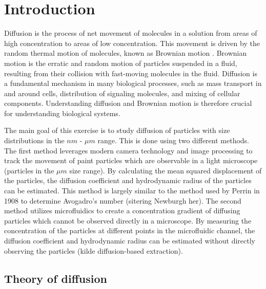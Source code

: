 \section{Introduction}


Diffusion is the process of net movement of molecules in a solution from areas of high concentration
to areas of low concentration. This movement is driven
by the random thermal motion of molecules, known as Brownian motion \cite[512]{author2020book}.
Brownian motion is the erratic and random motion of particles suspended in a fluid,
resulting from their collision with fast-moving molecules in the fluid.
Diffusion is a fundamental mechanism in many biological processes,
such as mass transport in and around cells,
distribution of signaling molecules, and mixing of cellular components.
Understanding diffusion and Brownian motion is therefore crucial for understanding biological systems.

The main goal of this exercise is to study diffusion of particles with size distributions in the $nm$ - $\mu m$ range.
This is done using two different methods. The first method leverages modern camera technology and image processing to track the movement of
paint particles which are observable in a light microscope (particles in the $\mu m$ size range).
By calculating the mean squared displacement
of the particles, the diffusion coefficient and hydrodynamic radius of the particles can be estimated.
This method is largely similar to the method used by Perrin in 1908 to determine Avogadro's number (sitering Newburgh her).
The second method utilizes microfluidics to create a concentration gradient of diffusing particles which
cannot be observed directly in a microscope. By measuring the concentration of the particles at different points in the microfluidic channel,
the diffusion coefficient and hydrodynamic radius can be estimated without directly observing the particles (kilde diffusion-based extraction).


\subsection{Theory of diffusion}

